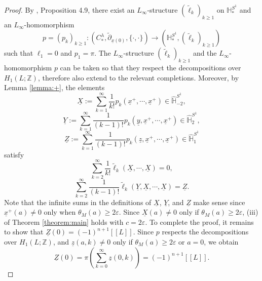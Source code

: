 \documentclass[a4paper]{article}
\numberwithin{equation}{section}
\begin{document}
\begin{proof}
By \cite{jlf}, Proposition 4.9, there exist an $L_\infty$-structure $(\tilde{\ell}_k)_{k\geq1}$ on $\mathbb{H}_\ast^{S^1}$ and an $L_\infty$-homomorphism
\begin{equation}
p=(p_k)_{k\geq1}:\left(C_\ast^\lambda,\tilde{\partial}_{\underline{x}(0)},\{\cdot,\cdot\}\right)\rightarrow\left(\mathbb{H}_\ast^{S^1},(\tilde{\ell}_k)_{k\geq1}\right)
\end{equation}
such that $\ell_1=0$ and $p_1=\pi$. The $L_\infty$-structure $(\tilde{\ell}_k)_{k\geq1}$ and the $L_\infty$-homomorphism $p$ can be taken so that they respect the decompositions over $H_1(L;\mathbb{Z})$, therefore also extend to the relevant completions. Moreover, by Lemma \ref{lemma:+}, the elements
\begin{equation}\label{eq:MC}
\underline{X}:=\sum_{k=1}^\infty\frac{1}{k!}p_k(\underline{x}^+,\cdots,\underline{x}^+)\in\widehat{\mathbb{H}}_{-2}^{S^1},
\end{equation}
\begin{equation}
\underline{Y}:=\sum_{k=1}^\infty\frac{1}{(k-1)!}p_k(\underline{y},\underline{x}^+,\cdots,\underline{x}^+)\in\widehat{\mathbb{H}}_2^{S^1},
\end{equation}
\begin{equation}
\underline{Z}:=\sum_{k=1}^\infty\frac{1}{(k-1)!}p_k(\underline{z},\underline{x}^+,\cdots,\underline{x}^+)\in\widehat{\mathbb{H}}_1^{S^1}
\end{equation}
satisfy
\begin{equation}
\sum_{k=2}^\infty\frac{1}{k!}\tilde{\ell}_k(\underline{X},\cdots,\underline{X})=0,
\end{equation}
\begin{equation}
\sum_{k=2}^\infty\frac{1}{(k-1)!}\tilde{\ell}_k(\underline{Y},\underline{X},\cdots,\underline{X})=\underline{Z}.
\end{equation}
Note that the infinite sums in the definitions of $\underline{X}$, $\underline{Y}$, and $\underline{Z}$ make sense since $\underline{x}^+(a)\neq0$ only when $\theta_M(a)\geq2\varepsilon$. Since $\underline{X}(a)\neq0$ only if $\theta_M(a)\geq2\varepsilon$, (iii) of Theorem \ref{theorem:main} holds with $c=2\varepsilon$. To complete the proof, it remains to show that $\underline{Z}(0)=(-1)^{n+1}[\![L]\!]$. Since $p$ respects the decompositions over $H_1(L;\mathbb{Z})$, and $\underline{z}(a,k)\neq0$ only if $\theta_M(a)\geq2\varepsilon$ or $a=0$, we obtain
\begin{equation}
\underline{Z}(0)=\pi\left(\sum_{k=0}^\infty\underline{z}(0,k)\right)=(-1)^{n+1}[\![L]\!].
\end{equation}
\end{proof}
\end{document}
